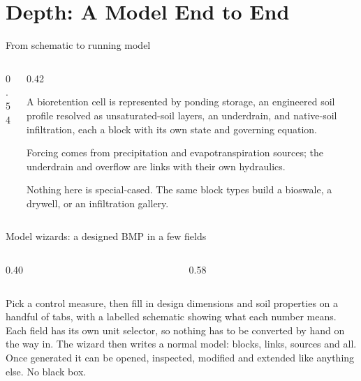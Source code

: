 \documentclass[aspectratio=169, 10pt]{beamer}
\begin{document}
\section{Depth: A Model End to End}

\begin{frame}{From schematic to running model}
  \begin{columns}[T,onlytextwidth]
    \begin{column}{0.54\textwidth}
    \end{column}
    \begin{column}{0.42\textwidth}
      {\footnotesize
      A bioretention cell is represented by ponding storage, an engineered soil
      profile resolved as unsaturated-soil layers, an underdrain, and native-soil
      infiltration, each a block with its own state and governing equation.

      \vspace{0.5em}
      Forcing comes from precipitation and evapotranspiration sources; the
      underdrain and overflow are links with their own hydraulics.

      \vspace{0.5em}
      \alert{Nothing here is special-cased.} The same block types build a
      bioswale, a drywell, or an infiltration gallery.}
    \end{column}
  \end{columns}
\end{frame}

\begin{frame}{Model wizards: a designed BMP in a few fields}
  \begin{columns}[c,onlytextwidth]
    \begin{column}{0.40\textwidth}
    \end{column}
    \begin{column}{0.58\textwidth}
    \end{column}
  \end{columns}
  \vspace{0.3em}
  {\scriptsize Pick a control measure, then fill in design dimensions and soil
  properties on a handful of tabs, with a labelled schematic showing what each
  number means. \alert{Each field has its own unit selector}, so nothing has to
  be converted by hand on the way in. The wizard then writes a normal model:
  blocks, links, sources and all. Once generated it can be opened, inspected,
  modified and extended like anything else. No black box.}
\end{frame}
\end{document}
